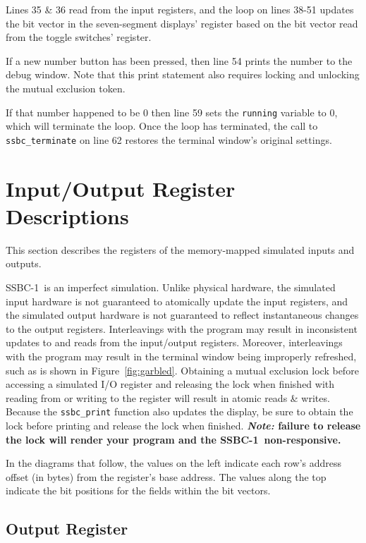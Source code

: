 \documentclass[12pt]{article}
\newcommand{\SSBC}{SSBC-1}
\begin{document}
Lines 35 \& 36 read from the input registers, and the loop on lines 38-51
updates the bit vector in the seven-segment displays' register based on the bit
vector read from the toggle switches' register.

If a new number button has been pressed, then line 54 prints the number to the
debug window. Note that this print statement also requires locking and
unlocking the mutual exclusion token.

If that number happened to be $0$ then line 59 sets the \texttt{running}
variable to 0, which will terminate the loop. Once the loop has terminated, the
call to \texttt{ssbc\_terminate} on line 62 restores the terminal window's
original settings.

\section{Input/Output Register Descriptions} \label{sec:registers}

This section describes the registers of the memory-mapped simulated inputs and
outputs.

\SSBC\ is an imperfect simulation. Unlike physical hardware, the simulated
input hardware is not guaranteed to atomically update the input registers, and
the simulated output hardware is not guaranteed to reflect instantaneous
changes to the output registers. Interleavings with the program may result in
inconsistent updates to and reads from the input/output registers. Moreover,
interleavings with the program may result in the terminal window being
improperly refreshed, such as is shown in Figure~\ref{fig:garbled}. Obtaining
a mutual exclusion lock before accessing a simulated I/O register and releasing
the lock when finished with reading from or writing to the register will result
in atomic reads \& writes. Because the \texttt{ssbc\_print} function also
updates the display, be sure to obtain the lock before printing and release the
lock when finished. \textbf{\textit{Note: }failure to release the lock will
render your program and the \SSBC\ non-responsive.}

In the diagrams that follow, the values on the left indicate each row's address
offset (in bytes) from the register's base address. The values along the top
indicate the bit positions for the fields within the bit vectors.

\subsection{Output Register}
\end{document}
